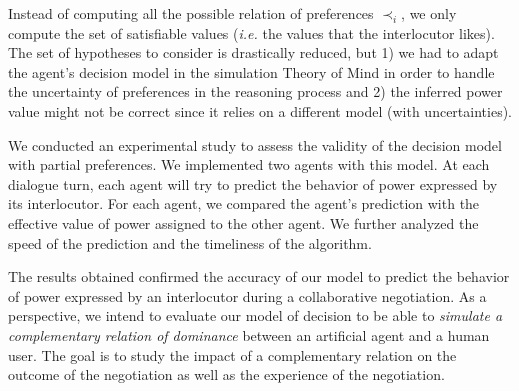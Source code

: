 \documentclass[sigconf]{aamas}  %
\begin{document}
	Instead of computing all the possible relation of preferences $\prec_i$, we only compute the set of satisfiable values (\emph{i.e.} the values that the interlocutor likes). The set of hypotheses to consider is drastically reduced, but 1) we had to adapt the agent's decision model in the simulation Theory of Mind in order to handle the uncertainty of preferences in the reasoning process and 2) the inferred power value might not be correct since it relies on a different model (with uncertainties).
	
	
	We conducted an experimental study to assess the validity of the decision model with partial preferences. We implemented two agents with this model. At each dialogue turn, each agent will try to predict the behavior of power expressed by its interlocutor. For each agent, we compared the agent's prediction with the effective value of power assigned to the other agent. We further analyzed the speed of the prediction and the timeliness of the algorithm.
	
	
	The results obtained confirmed the accuracy of our model to predict the behavior of power expressed by an interlocutor during a collaborative negotiation.  As a perspective, we intend to evaluate our model of decision to be able to \emph{simulate a complementary relation of dominance} between an artificial agent and a human user. The goal is to study the impact of a complementary relation on the outcome of the negotiation as well as the experience of the negotiation.



\end{document}

